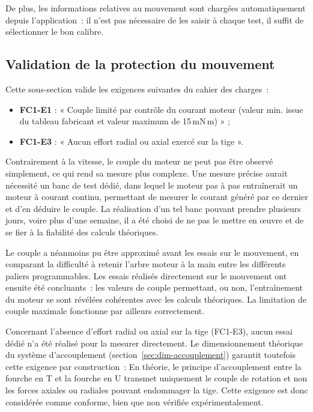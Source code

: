 De plus, les informations relatives au mouvement sont chargées automatiquement
depuis l'application~: il n'est pas nécessaire de les saisir à chaque test, il
suffit de sélectionner le bon calibre.

\subsection{Validation de la protection du mouvement}

Cette sous-section valide les exigences suivantes du cahier des charges~:
\begin{itemize}
    \item \textbf{FC1-E1} : « Couple limité par contrôle du courant moteur
          (valeur min. issue du tableau fabricant et valeur maximum de
          15\,mN\,m) » ;
    \item \textbf{FC1-E3} : « Aucun effort radial ou axial exercé sur la
          tige ».
\end{itemize}

Contrairement à la vitesse, le couple du moteur ne peut pas être observé
simplement, ce qui rend sa mesure plus complexe. Une mesure précise aurait
nécessité un banc de test dédié, dans lequel le moteur pas à pas entraînerait
un moteur à courant continu, permettant de mesurer le courant généré par ce
dernier et d'en déduire le couple. La réalisation d'un tel banc pouvant prendre
plusieurs jours, voire plus d'une semaine, il a été choisi de ne pas le mettre
en œuvre et de se fier à la fiabilité des calculs théoriques.

Le couple a néanmoins pu être approximé avant les essais sur le mouvement, en
comparant la difficulté à retenir l'arbre moteur à la main entre les différents
paliers programmables. Les essais réalisés directement sur le mouvement ont
ensuite été concluants~: les valeurs de couple permettant, ou non,
l'entraînement du moteur se sont révélées cohérentes avec les calculs
théoriques. La limitation de couple maximale fonctionne par ailleurs
correctement.

Concernant l'absence d'effort radial ou axial sur la tige (FC1-E3), aucun
essai dédié n'a été réalisé pour la mesurer directement. Le dimensionnement
théorique du système d'accouplement (section~\ref{sec:dim-accouplement})
garantit toutefois cette exigence par construction~: En théorie, le principe
d'accouplement entre la fourche en T et la fourche en U
transmet uniquement le couple de rotation et non les forces axiales ou radiales pouvant endommager la tige.
Cette exigence est donc considérée comme conforme, bien
que non vérifiée expérimentalement.

